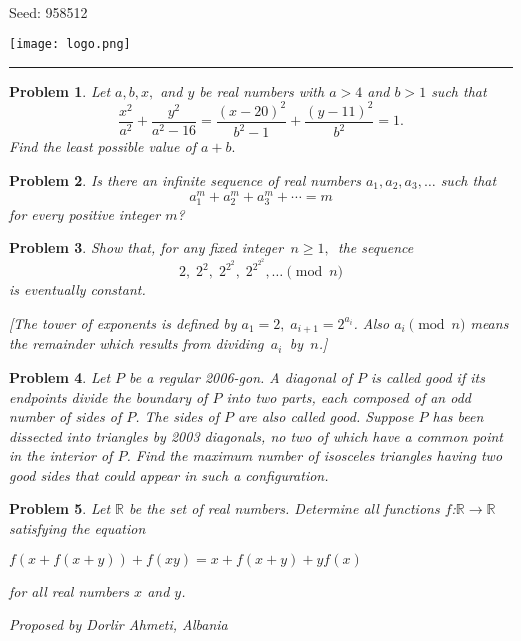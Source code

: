 \documentclass[12pt]{article}
\newtheorem{opg}{Problem}
\begin{document}
\parbox{0.6\textwidth}{ \\[2ex] {\Large Seed: 958512}}
\parbox{0.4\textwidth}{\texttt{[image: logo.png]}}

\hrule

\begin{opg}
Let $a, b, x,$ and $y$ be real numbers with $a>4$ and $b>1$ such that\[\frac{x^2}{a^2}+\frac{y^2}{a^2-16}=\frac{(x-20)^2}{b^2-1}+\frac{(y-11)^2}{b^2}=1.\]Find the least possible value of $a+b.$


\end{opg}
\begin{opg}
Is there an infinite sequence of real numbers $a_1, a_2, a_3, \dots$ such that
\[
a_1^m + a_2^m + a_3^m + \cdots = m
\]
for every positive integer $m$?

\end{opg}
\begin{opg}
Show that, for any fixed integer $\,n \geq 1,\,$ the sequence
\[2, \; 2^2, \; 2^{2^2}, \; 2^{2^{2^2}}, \ldots  \pmod{n}\]
is eventually constant. 

[The tower of exponents is defined by $a_1 = 2, \; a_{i+1} = 2^{a_i}$. Also $a_i \pmod{n}$ means the remainder which results from dividing $\,a_i\,$ by $\,n$.]


\end{opg}
\begin{opg}
Let $P$ be a regular 2006-gon. A diagonal of $P$ is called good if its endpoints divide the boundary of $P$ into two parts, each composed of an odd number of sides of $P$. The sides of $P$ are also called good.
Suppose $P$ has been dissected into triangles by 2003 diagonals, no two of which have a common point in the interior of $P$. Find the maximum number of isosceles triangles having two good sides that could appear in such a configuration.


\end{opg}
\begin{opg}
Let $\mathbb{R}$ be the set of real numbers. Determine all functions $f$:$\mathbb{R}\rightarrow\mathbb{R}$ satisfying the equation

$f(x+f(x+y))+f(xy) = x+f(x+y)+yf(x)$

for all real numbers $x$ and $y$.

Proposed by Dorlir Ahmeti, Albania


\end{opg}
\end{document}
